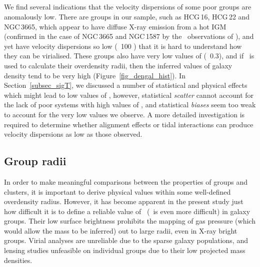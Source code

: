 \documentclass[usenatbib]{mn2e}
\begin{document}
\subsection{\sigmav}

We find several indications that the velocity dispersions of some poor groups are
anomalously low.  There are groups in our sample, such as HCG\,16, HCG\,22 and
NGC\,3665, which appear to have diffuse X-ray emission from a hot IGM (confirmed
in the case of NGC\,3665 and NGC\,1587 by the \Chandra\ observations of
\citet{helsdon04}), and yet have velocity dispersions so  low (\ltsim\ 100
\kmps) that it is hard to understand how they can be virialised. These groups
also have very low values of \betaspec (\ltsim\ 0.3), and if \sigmav\ is used to
calculate their overdensity radii, then the inferred values of galaxy density tend
to be very high (Figure~\ref{fig_dengal_hist}). In Section~\ref{subsec_sigT}, we
discussed a number of statistical and physical effects which might lead to low
values of \sigmav, however, statistical {\it scatter} cannot account for the
lack of poor systems with high values of \betaspec, and statistical {\it biases}
seem too weak to account for the very low values we observe.  A more detailed
investigation is required to determine whether alignment effects or tidal
interactions can produce velocity dispersions as low as those observed.


\subsection{Group radii}

In order to make meaningful comparisons between the properties of groups and
clusters, it is important to derive physical values within some well-defined
overdensity radius.  However, it has become apparent in the present study just
how difficult it is to define a reliable value of \rfh\ (\rth\ is even more
difficult) in galaxy groups.  Their low surface brightness prohibits the mapping
of gas pressure (which would allow the mass to be inferred) out to large radii,
even in X-ray bright groups.  Virial analyses are  unreliable due to the sparse
galaxy populations, and lensing studies unfeasible on individual groups due to
their low projected mass densities.
\end{document}

